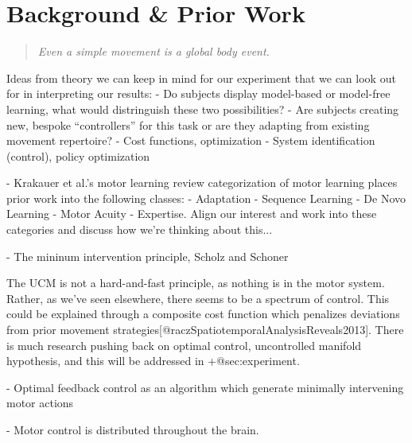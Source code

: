 \documentclass[../main.tex]{subfiles}
\begin{document}
\chapter{Background \& Prior Work}\label{chap:bg_theory}

\begin{quote}
  \emph{Even a simple movement is a global body event.}
\end{quote}  





Ideas from theory we can keep in mind for our experiment that we can look out for in interpreting our results:
- Do subjects display model-based or model-free learning, what would distringuish these two possibilities?
- Are subjects creating new, bespoke ``controllers'' for this task or are they adapting from existing movement repertoire?
- Cost functions, optimization
- System identification (control), policy optimization


- Krakauer et al.'s motor learning review categorization of motor learning places prior work into the following classes: - Adaptation - Sequence Learning - De Novo Learning - Motor Acuity - Expertise. Align our interest and work into these categories and discuss how we're thinking about this...

- The mininum intervention principle, Scholz and Schoner

The UCM is not a hard-and-fast principle, as nothing is in the motor system. Rather, as we've seen elsewhere, there seems to be a spectrum of control. This could be explained through a composite cost function which penalizes deviations from prior movement strategies[@raczSpatiotemporalAnalysisReveals2013]. There is much research pushing back on optimal control, uncontrolled manifold hypothesis, and this will be addressed in {+@sec:experiment}. 


- Optimal feedback control as an algorithm which generate minimally intervening motor actions

- Motor control is distributed throughout the brain\cite{sejnowskiPerspectivesCognitiveNeuroscience1988}.
\end{document}
